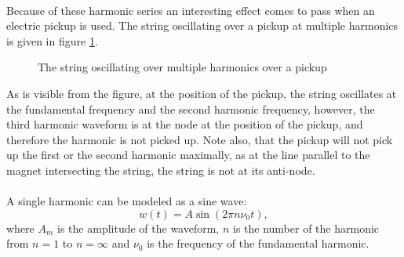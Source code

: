 \documentclass{article}
\begin{document}
\paragraph*{} 
Because of these harmonic series an interesting effect comes to pass when an 
electric pickup is used. The string oscillating over a pickup at multiple 
harmonics is given in figure \ref{fig:pickup-harmonics}. 
\begin{figure}[ht]
	\centering
	\caption{The string oscillating over multiple harmonics over a pickup}
	\label{fig:pickup-harmonics}
\end{figure}
As is visible from the figure, at the position of the pickup, the string 
oscillates at the fundamental frequency and the second harmonic frequency, 
however, the third harmonic waveform is at the node at the position of the 
pickup, and therefore the harmonic is not picked up. Note also, that the 
pickup will not pick up the first or the second harmonic maximally, as at the 
line parallel to the magnet intersecting the string, the string is not at its 
anti-node.

\paragraph*{} 
A single harmonic can be modeled as a sine wave:
\begin{equation} 
	w(t) = A \sin ( 2 \pi n \nu_0 t),
	\label{eqn:basic-harmonic}
\end{equation}
where $A_m$ is the amplitude of the waveform, $n$ is the number of the 
harmonic from $n=1$ to $n=\infty$ and $\nu_0$ is the frequency of the 
fundamental harmonic.
\end{document}
